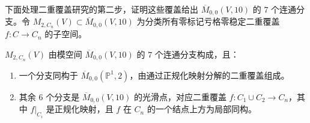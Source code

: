 下面处理二重覆盖研究的第二步，证明这些覆盖给出 $\overline M_{0,0}(V,10)$ 的 $7$ 个连通分支。令 $M_{2,C_n}(V)\subset\overline M_{0,0}(V,10)$ 为分类所有零标记亏格零稳定二重覆盖 $f:C\to C_n$ 的子空间。
\begin{proposition}\label{prop:nodal-double-cover-components}
$M_{2,C_n}(V)$ 由模空间 $\overline M_{0,0}(V,10)$ 的 $7$ 个连通分支构成，且：
\begin{enumerate}[label=(\roman*)]
\item 一个分支同构于 $\overline M_{0,0}(\mathbb P^1,2)$，由通过正规化映射分解的二重覆盖组成。
\item 其余 $6$ 个分支是 $\overline M_{0,0}(V,10)$ 的光滑点，对应二重覆盖 $f:C_1\cup C_2\to C_n$，其中 $f|_{C_i}$ 是正规化映射，且 $f$ 在 $C_n$ 的一个结点上方为局部同构。
\end{enumerate}
\end{proposition}
